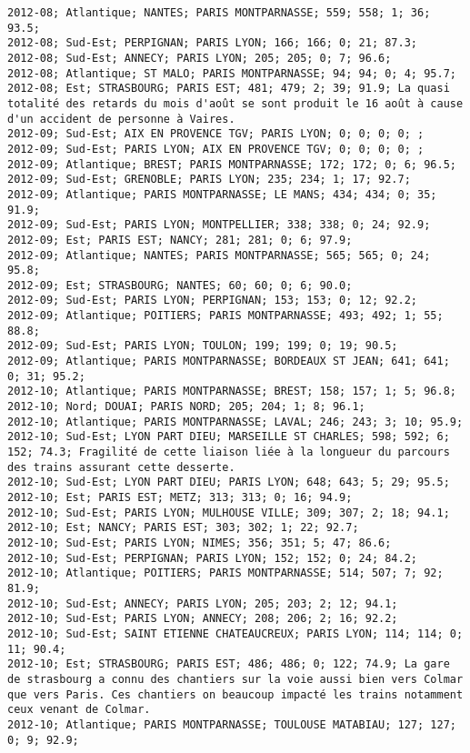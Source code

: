 \documentclass{article}
\begin{document}
\begin{Verbatim}[commandchars=\\\{\}]
2012-08; Atlantique; NANTES; PARIS MONTPARNASSE; 559; 558; 1; 36; 93.5; 
2012-08; Sud-Est; PERPIGNAN; PARIS LYON; 166; 166; 0; 21; 87.3; 
2012-08; Sud-Est; ANNECY; PARIS LYON; 205; 205; 0; 7; 96.6; 
2012-08; Atlantique; ST MALO; PARIS MONTPARNASSE; 94; 94; 0; 4; 95.7; 
2012-08; Est; STRASBOURG; PARIS EST; 481; 479; 2; 39; 91.9; La quasi totalité des retards du mois d'août se sont produit le 16 août à cause d'un accident de personne à Vaires.
2012-09; Sud-Est; AIX EN PROVENCE TGV; PARIS LYON; 0; 0; 0; 0; ; 
2012-09; Sud-Est; PARIS LYON; AIX EN PROVENCE TGV; 0; 0; 0; 0; ; 
2012-09; Atlantique; BREST; PARIS MONTPARNASSE; 172; 172; 0; 6; 96.5; 
2012-09; Sud-Est; GRENOBLE; PARIS LYON; 235; 234; 1; 17; 92.7; 
2012-09; Atlantique; PARIS MONTPARNASSE; LE MANS; 434; 434; 0; 35; 91.9; 
2012-09; Sud-Est; PARIS LYON; MONTPELLIER; 338; 338; 0; 24; 92.9; 
2012-09; Est; PARIS EST; NANCY; 281; 281; 0; 6; 97.9; 
2012-09; Atlantique; NANTES; PARIS MONTPARNASSE; 565; 565; 0; 24; 95.8; 
2012-09; Est; STRASBOURG; NANTES; 60; 60; 0; 6; 90.0; 
2012-09; Sud-Est; PARIS LYON; PERPIGNAN; 153; 153; 0; 12; 92.2; 
2012-09; Atlantique; POITIERS; PARIS MONTPARNASSE; 493; 492; 1; 55; 88.8; 
2012-09; Sud-Est; PARIS LYON; TOULON; 199; 199; 0; 19; 90.5; 
2012-09; Atlantique; PARIS MONTPARNASSE; BORDEAUX ST JEAN; 641; 641; 0; 31; 95.2; 
2012-10; Atlantique; PARIS MONTPARNASSE; BREST; 158; 157; 1; 5; 96.8; 
2012-10; Nord; DOUAI; PARIS NORD; 205; 204; 1; 8; 96.1; 
2012-10; Atlantique; PARIS MONTPARNASSE; LAVAL; 246; 243; 3; 10; 95.9; 
2012-10; Sud-Est; LYON PART DIEU; MARSEILLE ST CHARLES; 598; 592; 6; 152; 74.3; Fragilité de cette liaison liée à la longueur du parcours des trains assurant cette desserte.
2012-10; Sud-Est; LYON PART DIEU; PARIS LYON; 648; 643; 5; 29; 95.5; 
2012-10; Est; PARIS EST; METZ; 313; 313; 0; 16; 94.9; 
2012-10; Sud-Est; PARIS LYON; MULHOUSE VILLE; 309; 307; 2; 18; 94.1; 
2012-10; Est; NANCY; PARIS EST; 303; 302; 1; 22; 92.7; 
2012-10; Sud-Est; PARIS LYON; NIMES; 356; 351; 5; 47; 86.6; 
2012-10; Sud-Est; PERPIGNAN; PARIS LYON; 152; 152; 0; 24; 84.2; 
2012-10; Atlantique; POITIERS; PARIS MONTPARNASSE; 514; 507; 7; 92; 81.9; 
2012-10; Sud-Est; ANNECY; PARIS LYON; 205; 203; 2; 12; 94.1; 
2012-10; Sud-Est; PARIS LYON; ANNECY; 208; 206; 2; 16; 92.2; 
2012-10; Sud-Est; SAINT ETIENNE CHATEAUCREUX; PARIS LYON; 114; 114; 0; 11; 90.4; 
2012-10; Est; STRASBOURG; PARIS EST; 486; 486; 0; 122; 74.9; La gare de strasbourg a connu des chantiers sur la voie aussi bien vers Colmar que vers Paris. Ces chantiers on beaucoup impacté les trains notamment ceux venant de Colmar.
2012-10; Atlantique; PARIS MONTPARNASSE; TOULOUSE MATABIAU; 127; 127; 0; 9; 92.9; 

\end{Verbatim}
\end{document}

